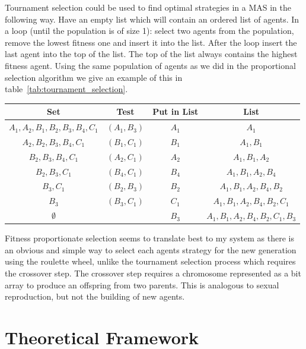 \documentclass[]{final_report}
\begin{document}
Tournament selection could be used to find optimal strategies in a MAS in the following way. Have an empty list which will contain an ordered list of agents. In a loop (until the population is of size 1): select two agents from the population, remove the lowest fitness one and insert it into the list. After the loop insert the last agent into the top of the list. The top of the list always contains the highest fitness agent. Using the same population of agents as we did in the proportional selection algorithm we give an example of this in table~\ref{tab:tournament_selection}.
\begin{framed}
	\begin{center}
		\begin{tabular}{c|c|c|c}
		Set & Test & Put in List & List\\
		\hline
		${A_1, A_2, B_1, B_2, B_3, B_4, C_1}$ & $(A_1, B_3)$ & $A_1$ & ${A_1}$ \\
		${A_2, B_2, B_3, B_4, C_1}$ & $(B_1, C_1)$ & $B_1$ & ${A_1, B_1}$\\
		${B_2, B_3, B_4, C_1}$ & $(A_2, C_1)$ & $A_2$ & ${A_1, B_1, A_2}$\\
		${B_2, B_3, C_1}$ & $(B_4, C_1)$ & $B_4$ & ${A_1, B_1, A_2, B_4}$\\
		${B_3, C_1}$ & $(B_2, B_3)$ & $B_2$ & ${A_1, B_1, A_2, B_4, B_2}$\\
		${B_3}$ & $(B_3, C_1)$ & $C_1$ & ${A_1, B_1, A_2, B_4, B_2, C_1}$\\
		$\emptyset$	& & $B_3$ & ${A_1, B_1, A_2, B_4, B_2, C_1, B_3}$
		\end{tabular}
		\label{tab:tournament_selection}
	\end{center}	
\end{framed}
Fitness proportionate selection seems to translate best to my system as there is an obvious and simple way to select each agents strategy for the new generation using the roulette wheel, unlike the tournament selection process which requires the crossover step. The crossover step requires a chromosome represented as a bit array to produce an offspring from two parents. This is analogous to sexual reproduction, but not the building of new agents.

\section{Theoretical Framework}
\end{document}
